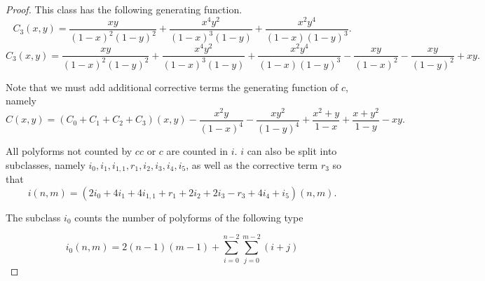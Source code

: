 \documentclass[12pt]{article}
\theoremstyle{plain}
\theoremstyle{definition}
\theoremstyle{remark}
\theoremstyle{definition}
\newcommand{\cellw}[4]{\draw[thick] ( #1 , #2 ) rectangle ( #3 , #4 );}
\newcommand{\cellb}[4]{\filldraw[black!60] ( #1 , #2 ) rectangle ( #3 , #4 ); \draw[thick] ( #1 , #2 ) rectangle ( #3 , #4 );}
\begin{document}
\begin{proof}
This class has the following generating function.
$$C_3(x,y)=\frac{xy}{(1-x)^2(1-y)^2}+\frac{x^4 y^2}{(1-x)^3(1-y)}+\frac{x^2y^4}{(1-x)(1-y)^3}.$$
$$C_3(x,y)=\frac{xy}{(1-x)^2(1-y)^2}+\frac{x^4 y^2}{(1-x)^3(1-y)}+\frac{x^2y^4}{(1-x)(1-y)^3} - \frac{xy}{(1-x)^2} - \frac{xy}{(1-y)^2} + xy.$$

Note that we must add additional corrective terms the generating function of $c$, namely
$$C(x,y)=(C_0+C_1+C_2+C_3)(x,y) -\frac{x^2 y}{(1-x)^4} -\frac{x y^2}{(1-y)^4} + \frac{x^2+y}{1-x} + \frac{x+y^2}{1-y}-xy.$$

All polyforms not counted by $cc$ or $c$ are counted in $i$. $i$ can also be split into subclasses, namely $i_0,i_1,i_{1,1},r_1,i_2,i_3,i_4, i_5$, as well as the corrective term $r_3$ so that 
$$i(n,m)=(2i_{0}+4i_{1}+4i_{1,1}+r_1+2i_{2}+2i_{3}-r_3 + 4i_{4} + i_5)(n,m).$$

The subclass $i_0$ counts the number of polyforms of the following type
\begin{center}
\end{center}

\begin{equation*}
    i_0(n,m)= 2(n-1)(m-1) + \sum_{i=0}^{n-2}\sum_{j=0}^{m-2} (i+j)
\end{equation*}


\end{proof}
\end{document}
